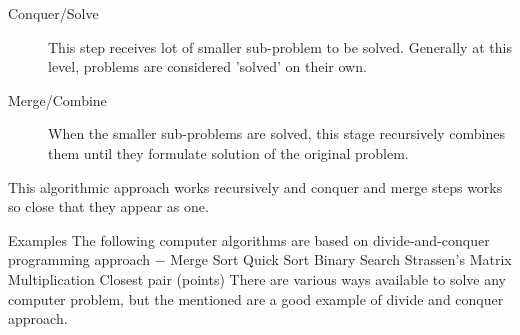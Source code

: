 \documentclass{beamer}
\begin{document}
\begin{frame}
\begin{description}
	\item[Conquer/Solve]
This step receives lot of smaller sub-problem to be solved. Generally at this level, problems are considered 'solved' on their own.

	\item[Merge/Combine]
When the smaller sub-problems are solved, this stage recursively combines them until they formulate solution of the original problem.
\end{description}
\end{frame}
\begin{frame}
This algorithmic approach works recursively and conquer and merge steps works so close that they appear as one.


\end{frame}
\begin{frame}
Examples
The following computer algorithms are based on divide-and-conquer programming approach −
Merge Sort
Quick Sort
Binary Search
Strassen's Matrix Multiplication
Closest pair (points)
There are various ways available to solve any computer problem, but the mentioned are a good example of divide and conquer approach.

\end{frame}
\end{document}
